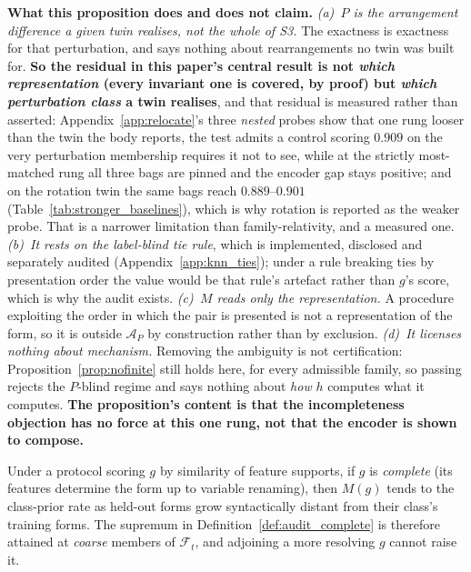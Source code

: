 \noindent \textbf{What this proposition does and does not claim.} \emph{(a)~$P$ is the arrangement difference a given twin realises, not the whole of S3.} The exactness is exactness for that perturbation, and says nothing about rearrangements no twin was built for. \textbf{So the residual in this paper's central result is not \emph{which representation} (every invariant one is covered, by proof) but \emph{which perturbation class} a twin realises}, and that residual is measured rather than asserted: Appendix~\ref{app:relocate}'s three \emph{nested} probes show that one rung looser than the twin the body reports, the test admits a control scoring $0.909$ on the very perturbation membership requires it not to see, while at the strictly most-matched rung all three bags are pinned and the encoder gap stays positive; and on the rotation twin the same bags reach $0.889$--$0.901$ (Table~\ref{tab:stronger_baselines}), which is why rotation is reported as the weaker probe. That is a narrower limitation than family-relativity, and a measured one. \emph{(b)~It rests on the label-blind tie rule}, which is implemented, disclosed and separately audited (Appendix~\ref{app:knn_ties}); under a rule breaking ties by presentation order the value would be that rule's artefact rather than $g$'s score, which is why the audit exists. \emph{(c)~$M$ reads only the representation.} A procedure exploiting the order in which the pair is presented is not a representation of the form, so it is outside $\mathcal{A}_P$ by construction rather than by exclusion. \emph{(d)~It licenses nothing about mechanism.} Removing the ambiguity is not certification: Proposition~\ref{prop:nofinite} still holds here, for every admissible family, so passing rejects the $P$-blind regime and says nothing about \emph{how} $h$ computes what it computes. \textbf{The proposition's content is that the incompleteness objection has no force at this one rung, not that the encoder is shown to compose.}

\begin{proposition}
\label{prop:resolution}
Under a protocol scoring $g$ by similarity of feature supports, if $g$ is \emph{complete} (its features determine the form up to variable renaming), then $M(g)$ tends to the class-prior rate as held-out forms grow syntactically distant from their class's training forms. The supremum in Definition~\ref{def:audit_complete} is therefore attained at \emph{coarse} members of $\mathcal{F}_t$, and adjoining a more resolving $g$ cannot raise it.
\end{proposition}

